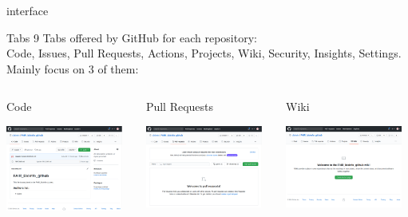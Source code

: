 \begin{frame}{ interface}
\begin{exampleblock}{Tabs}
9 Tabs offered by GitHub for each repository: \\
Code, Issues, Pull Requests, Actions, Projects, Wiki, Security, Insights, Settings.\\
Mainly focus on 3 of them:
\end{exampleblock}
\begin{columns}
\begin{column}{0.32\textwidth}
\begin{exampleblock}{Code}
\begin{center}
    \includegraphics[height=2.8cm]{05_history/Images/FAIR_github_CodeTab.png}
\end{center}
\end{exampleblock}
\end{column}
\begin{column}{0.32\textwidth}
\begin{exampleblock}{Pull Requests}
\begin{center}
    \includegraphics[height=2.7cm]{05_history/Images/FAIR_github_PullTab.png}
\end{center}
\end{exampleblock}
\end{column}
\begin{column}{0.32\textwidth}
\begin{exampleblock}{Wiki}
\begin{center}
    \includegraphics[height=2.7cm]{05_history/Images/FAIR_github_WikiTab.png}
\end{center}
\end{exampleblock}
\end{column}
\end{columns}
\end{frame}
